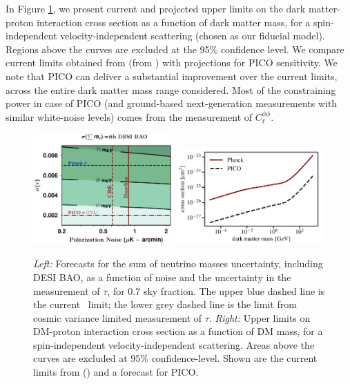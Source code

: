 \documentclass[PICOReport.tex]{subfiles}
\begin{document}
In Figure \ref{fig:DM_baryons}, we present current and projected upper limits on the dark matter-proton interaction cross section as a function of dark matter mass, for a spin-independent velocity-independent scattering (chosen as our fiducial model). Regions above the curves are excluded at the 95$\%$ confidence level. We compare current limits obtained from {\planck} (from \cite{2018PhRvL.121h1301G}) with projections for PICO sensitivity.  We note that PICO can deliver a substantial improvement over the current limits, across the entire dark matter mass range considered.  Most of the constraining power in case of PICO (and ground-based next-generation measurements with similar white-noise levels) comes from the measurement of $C_\ell^{\phi \phi}$.
%
\begin{figure}[t]
\begin{center}
\includegraphics[width=0.48\textwidth]{images/Mnu_tauprior_final.pdf}
\includegraphics[width=0.50\textwidth]{images/pico_dm_baryon.pdf}
\caption{\textit{Left:}  Forecasts for the sum of 
neutrino masses uncertainty, including DESI BAO, as a function of noise and the uncertainty in the measurement of $\tau$, 
for 0.7 sky fraction.  The upper blue dashed line is the current \planck~limit; the lower grey dashed line is the limit from cosmic variance 
limited measurement of $\tau$. \textit{Right:} Upper limits on DM-proton interaction cross section as a function of DM mass, for a spin-independent velocity-independent scattering. Areas above the curves are excluded at 95$\%$ confidence-level.
Shown are the current limits from \planck (\cite{2018PhRvL.121h1301G}) and a forecast for PICO.}\label{fig:DM_baryons}
\end{center}
\vspace{-0.15in}
\end{figure}
%
\end{document}
